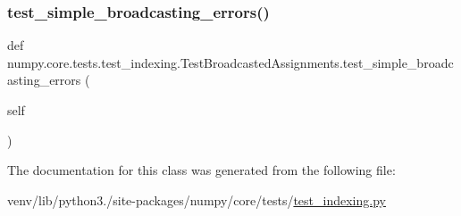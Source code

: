 \subsubsection{\texorpdfstring{test\+\_\+simple\+\_\+broadcasting\+\_\+errors()}{test\_simple\_broadcasting\_errors()}}
{\footnotesize\ttfamily def numpy.\+core.\+tests.\+test\+\_\+indexing.\+Test\+Broadcasted\+Assignments.\+test\+\_\+simple\+\_\+broadcasting\+\_\+errors (\begin{DoxyParamCaption}\item[{}]{self }\end{DoxyParamCaption})}



The documentation for this class was generated from the following file\+:\begin{DoxyCompactItemize}
\item 
venv/lib/python3./site-\/packages/numpy/core/tests/\hyperlink{test__indexing_8py}{test\+\_\+indexing.\+py}\end{DoxyCompactItemize}
